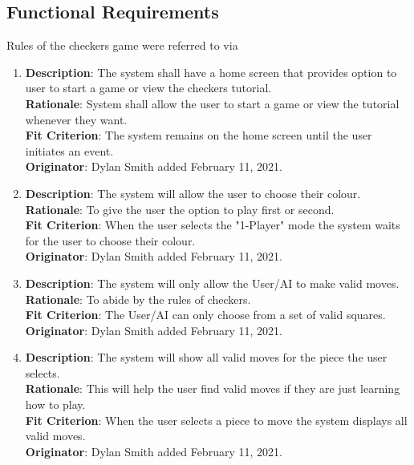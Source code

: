 \documentclass[12pt, titlepage]{article}
\begin{document}
    
\subsection{Functional Requirements}
Rules of the checkers game were referred to via \cite{CheckersWikipedia}
\begin{enumerate}[{FR}1.]
    \item\textbf{Description}: The system shall have a home screen that provides option to user to start a game or view the checkers tutorial.\\
        \textbf{Rationale}: System shall allow the user to start a game or view the tutorial whenever they want.\\
        \textbf{Fit Criterion}: The system remains on the home screen until the user initiates an event.\\
        \textbf{Originator}: Dylan Smith added February 11, 2021.
        
    \item\textbf{Description}: The system will allow the user to choose their colour.\\
        \textbf{Rationale}: To give the user the option to play first or second.\\
        \textbf{Fit Criterion}: When the user selects the "1-Player" mode the system waits for the user to choose their colour.\\
        \textbf{Originator}: Dylan Smith added February 11, 2021.
        
    \item\textbf{Description}: The system will only allow the User/AI to make valid moves.\\
        \textbf{Rationale}: To abide by the rules of checkers.\\
        \textbf{Fit Criterion}: The User/AI can only choose from a set of valid squares.\\
        \textbf{Originator}: Dylan Smith added February 11, 2021.
        
    \item\textbf{Description}: The system will show all valid moves for the piece the user selects.\\
        \textbf{Rationale}: This will help the user find valid moves if they are just learning how to play. \\
        \textbf{Fit Criterion}: When the user selects a piece to move the system displays all valid moves.\\
        \textbf{Originator}: Dylan Smith added February 11, 2021.
        

\end{enumerate}
\end{document}
